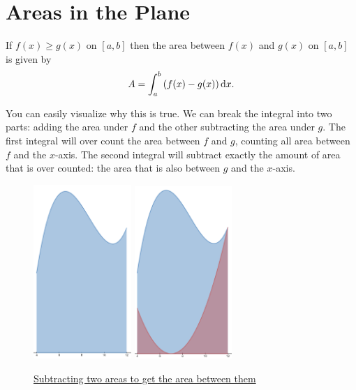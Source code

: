 \section{Areas in the Plane}
\begin{lemma}
	If $f(x) \geq g(x)$ on $[a,b]$ then the area between $f(x)$ and $g(x)$ on $[a,b]$ is given by
	\begin{equation*}
		A = \int_{a}^{b}{\left(f(x)-g(x)\right)\mathrm{d} x}.
	\end{equation*}
\end{lemma}

You can easily visualize why this is true.
We can break the integral into two parts: adding the area under $f$ and the other subtracting the area under $g$.
The first integral will over count the area between $f$ and $g$, counting all area between $f$ and the $x$-axis.
The second integral will subtract exactly the amount of area that is over counted: the area that is also between $g$ and the $x$-axis.

\begin{figure}[H]
	\label{area_between_curves}
	\centering
	\includegraphics[width = 0.33\textwidth]{./applications_integrals/curve1.png}
	\includegraphics[width = 0.33\textwidth]{./applications_integrals/curve2.png}
	\caption{\hyperref{}{}{}{Subtracting two areas to get the area between them}}
\end{figure}

